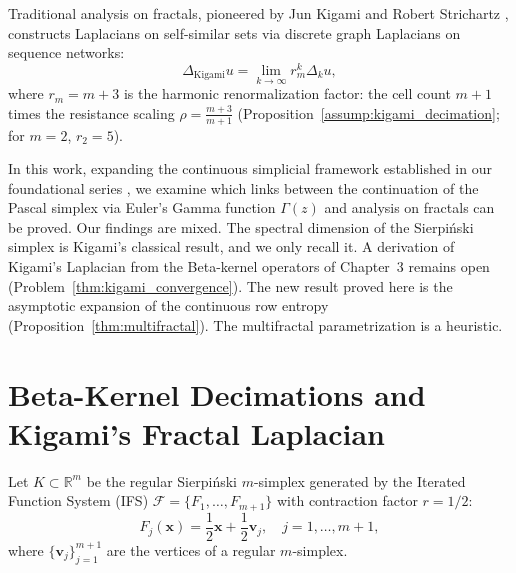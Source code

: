 \documentclass[11pt,a4paper]{article}
\theoremstyle{plain}
\theoremstyle{definition}
\theoremstyle{remark}
\numberwithin{equation}{section}
\begin{document}
Traditional analysis on fractals, pioneered by Jun Kigami and Robert Strichartz \cite{kigami2001, strichartz2006}, constructs Laplacians on self-similar sets via discrete graph Laplacians on sequence networks:
\begin{equation}
\Delta_{\text{Kigami}} u = \lim_{k \to \infty} r_m^k \Delta_k u,
\end{equation}
where $r_m = m+3$ is the harmonic renormalization factor: the cell count $m+1$ times the resistance scaling $\rho = \frac{m+3}{m+1}$ (Proposition~\ref{assump:kigami_decimation}; for $m=2$, $r_2 = 5$).

In this work, expanding the continuous simplicial framework established in our foundational series \cite{silvafilho2026simplex, silvafilho2026waves, silvafilho2026inter}, we examine which links between the continuation of the Pascal simplex via Euler's Gamma function $\Gamma(z)$ and analysis on fractals can be proved. Our findings are mixed. The spectral dimension of the Sierpi\'nski simplex is Kigami's classical result, and we only recall it. A derivation of Kigami's Laplacian from the Beta-kernel operators of Chapter~3 remains open (Problem~\ref{thm:kigami_convergence}). The new result proved here is the asymptotic expansion of the continuous row entropy (Proposition~\ref{thm:multifractal}). The multifractal parametrization is a heuristic.

\section{Beta-Kernel Decimations and Kigami's Fractal Laplacian}

Let $K \subset \mathbb{R}^{m}$ be the regular Sierpi\'nski $m$-simplex generated by the Iterated Function System (IFS) $\mathcal{F} = \{F_1, \dots, F_{m+1}\}$ with contraction factor $r = 1/2$:
\begin{equation}
F_j(\mathbf{x}) = \frac{1}{2}\mathbf{x} + \frac{1}{2}\mathbf{v}_j, \quad j=1,\dots,m+1,
\end{equation}
where $\{\mathbf{v}_j\}_{j=1}^{m+1}$ are the vertices of a regular $m$-simplex.
\end{document}
